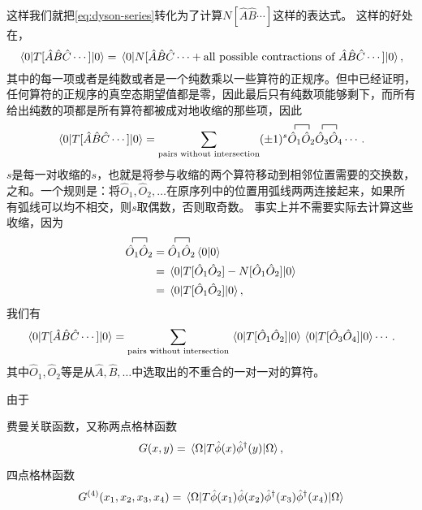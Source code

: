 \documentclass[hyperref, UTF8, a4paper]{ctexart}
\renewcommand{\autoref}{\prettyref}
\begin{document}
这样我们就把\eqref{eq:dyson-series}转化为了计算$N[\hat{A}\hat{B} \cdots]$这样的表达式。
这样的好处在，
\[
    \mel{0}{T[\hat{A} \hat{B} \hat{C} \cdots]}{0} = \mel{0}{N[\hat{A} \hat{B} \hat{C} \cdots + \text{all possible contractions of } \hat{A} \hat{B} \hat{C} \cdots]}{0},
\]
其中的每一项或者是纯数或者是一个纯数乘以一些算符的正规序。但\autoref{sec:algebra-ca-op}中已经证明，任何算符的正规序的真空态期望值都是零，因此最后只有纯数项能够剩下，而所有给出纯数的项都是所有算符都被成对地收缩的那些项，因此
\[
    \mel{0}{T[\hat{A} \hat{B} \hat{C} \cdots]}{0} = \sum_\text{pairs without intersection} (\pm 1)^s {\contraction{}{\hat{O}_1}{}{\hat{O}_2} \hat{O}_1 \hat{O}_2} {\contraction{}{\hat{O}_3}{}{\hat{O}_4} \hat{O}_3 \hat{O}_4} \cdots.
\]
$s$是每一对收缩的$s$，也就是将参与收缩的两个算符移动到相邻位置需要的交换数，之和。一个规则是：将$\hat{O}_1, \hat{O}_2, \ldots$在原序列中的位置用弧线两两连接起来，如果所有弧线可以均不相交，则$s$取偶数，否则取奇数。
事实上并不需要实际去计算这些收缩，因为
\[
    \begin{aligned}
        {\contraction{}{\hat{O}_1}{}{\hat{O}_2} \hat{O}_1 \hat{O}_2} &= {\contraction{}{\hat{O}_1}{}{\hat{O}_2} \hat{O}_1 \hat{O}_2} \braket{0}{0} \\
        &= \mel{0}{T[\hat{O}_1 \hat{O}_2] - N[\hat{O}_1 \hat{O}_2]}{0} \\
        &= \mel{0}{T[\hat{O}_1 \hat{O}_2]}{0},
    \end{aligned}
\]
我们有
\begin{equation}
    \mel{0}{T[\hat{A} \hat{B} \hat{C} \cdots]}{0} = \sum_\text{pairs without intersection} \mel{0}{T[\hat{O}_1 \hat{O}_2]}{0} \mel{0}{T[\hat{O}_3 \hat{O}_4]}{0} \cdots.
\end{equation}
其中$\hat{O}_1, \hat{O}_2$等是从$\hat{A},\hat{B}, \ldots$中选取出的不重合的一对一对的算符。

由于

费曼关联函数，又称两点格林函数
\begin{equation}
    G(x, y) = \mel{\Omega}{T \hat{\phi} (x) \hat{\phi}^\dagger(y) }{\Omega},
\end{equation}

四点格林函数
\begin{equation}
    G^{(4)} (x_1, x_2, x_3, x_4) = \mel{\Omega}{T \hat{\phi} (x_1) \hat{\phi}(x_2) \hat{\phi}^\dagger(x_3) \hat{\phi}^\dagger (x_4) }{\Omega}
\end{equation}
\end{document}
